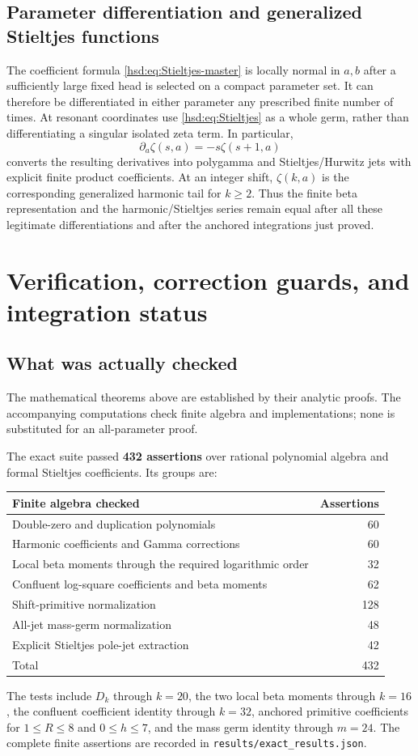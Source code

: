 \documentclass[11pt]{article}
\numberwithin{equation}{section}
\theoremstyle{definition}\newtheorem{definition}[theorem]{Definition}
\theoremstyle{remark}\newtheorem{remark}[theorem]{Remark}
\newcommand{\src}[1]{\nolinkurl{#1}}
\begin{document}
\subsection{Parameter differentiation and generalized Stieltjes functions}
The coefficient formula \eqref{hsd:eq:Stieltjes-master} is locally normal
in $a,b$ after a sufficiently large fixed head is selected on a compact
parameter set. It can therefore be differentiated in either parameter
any prescribed finite number of times. At resonant coordinates use
\eqref{hsd:eq:Stieltjes} as a whole germ, rather than differentiating a
singular isolated zeta term. In particular,
\[
 \partial_a\zeta(s,a)=-s\zeta(s+1,a)
\]
converts the resulting derivatives into polygamma and Stieltjes/Hurwitz
jets with explicit finite product coefficients. At an integer shift,
$\zeta(k,a)$ is the corresponding generalized harmonic tail for $k\ge2$.
Thus the finite beta representation and the harmonic/Stieltjes series
remain equal after all these legitimate differentiations and after the
anchored integrations just proved.

\section{Verification, correction guards, and integration status}
\label{hsd:sec:audit}
\subsection{What was actually checked}
The mathematical theorems above are established by their analytic proofs.
The accompanying computations check finite algebra and implementations;
none is substituted for an all-parameter proof.

The exact suite passed \textbf{432 assertions} over rational polynomial
algebra and formal Stieltjes coefficients. Its groups are:
\begin{center}
\begin{tabular}{lr}
\toprule
Finite algebra checked & Assertions\\
\midrule
Double-zero and duplication polynomials &60\\
Harmonic coefficients and Gamma corrections &60\\
Local beta moments through the required logarithmic order &32\\
Confluent log-square coefficients and beta moments &62\\
Shift-primitive normalization &128\\
All-jet mass-germ normalization &48\\
Explicit Stieltjes pole-jet extraction &42\\
\midrule
Total &432\\
\bottomrule
\end{tabular}
\end{center}
The tests include $D_k$ through $k=20$, the two local beta moments through
$k=16$, the confluent coefficient identity through $k=32$, anchored
primitive coefficients for $1\le R\le8$ and $0\le h\le7$, and the mass
germ identity through $m=24$. The complete finite assertions are recorded
in \src{results/exact_results.json}.
\end{document}
